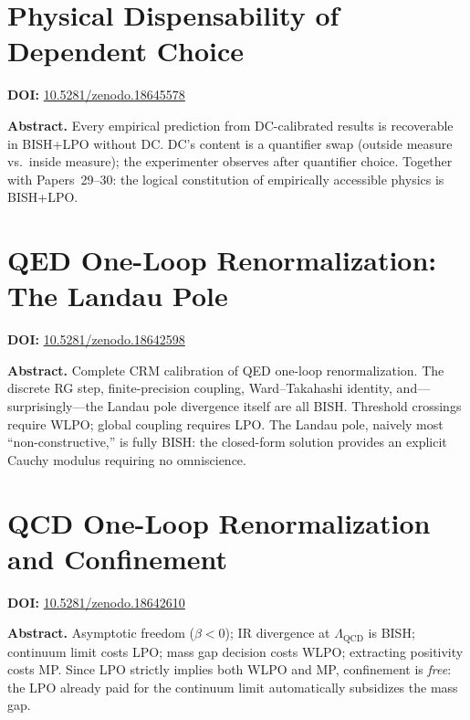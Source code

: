 \documentclass[11pt,a4paper]{article}
\begin{document}
\section{Physical Dispensability of Dependent Choice}
\label{sec:p31}
\textbf{DOI:} \href{https://doi.org/10.5281/zenodo.18645578}{10.5281/zenodo.18645578}

\bigskip
\noindent\textbf{Abstract.}
Every empirical prediction from DC-calibrated results is recoverable in BISH+LPO without DC. DC's content is a quantifier swap (outside measure vs.\ inside measure); the experimenter observes after quantifier choice. Together with Papers~29--30: the logical constitution of empirically accessible physics is BISH+LPO.

\section{QED One-Loop Renormalization: The Landau Pole}
\label{sec:p32}
\textbf{DOI:} \href{https://doi.org/10.5281/zenodo.18642598}{10.5281/zenodo.18642598}

\bigskip
\noindent\textbf{Abstract.}
Complete CRM calibration of QED one-loop renormalization. The discrete RG step, finite-precision coupling, Ward--Takahashi identity, and---surprisingly---the Landau pole divergence itself are all BISH. Threshold crossings require WLPO; global coupling requires LPO. The Landau pole, naively most ``non-constructive,'' is fully BISH: the closed-form solution provides an explicit Cauchy modulus requiring no omniscience.

\section{QCD One-Loop Renormalization and Confinement}
\label{sec:p33}
\textbf{DOI:} \href{https://doi.org/10.5281/zenodo.18642610}{10.5281/zenodo.18642610}

\bigskip
\noindent\textbf{Abstract.}
Asymptotic freedom ($\beta<0$); IR divergence at $\Lambda_{\mathrm{QCD}}$ is BISH; continuum limit costs LPO; mass gap decision costs WLPO; extracting positivity costs MP. Since LPO strictly implies both WLPO and MP, confinement is \emph{free}: the LPO already paid for the continuum limit automatically subsidizes the mass gap.

\end{document}
